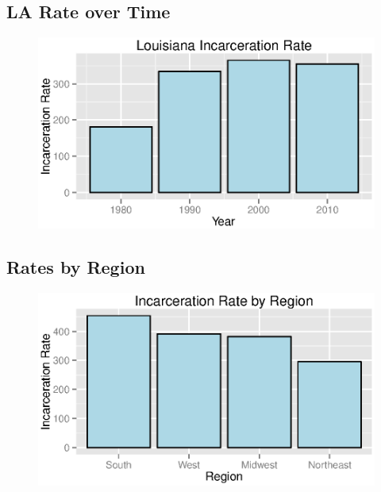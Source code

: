 \documentclass{exam}
\begin{document}
  \subsection{LA Rate over Time}
  \begin{figure}[H]
    \centering
    \includegraphics[scale = 0.9]{la_rate.eps}
  \end{figure}

  \subsection{Rates by Region}
  \begin{figure}[H]
    \centering
    \includegraphics[scale = 0.9]{rate_by_region.eps}
  \end{figure}
\end{document}
